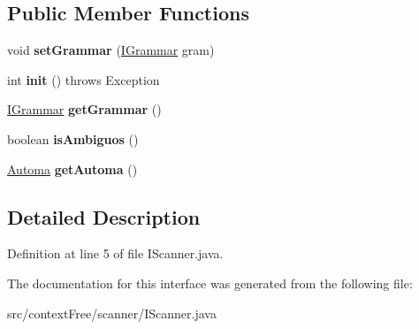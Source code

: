 \subsection*{Public Member Functions}
\begin{DoxyCompactItemize}
\item 
\hypertarget{interfacecontext_free_1_1scanner_1_1_i_scanner_a232592dfb2897cf3a2e670b5fcab88ef}{void {\bfseries set\-Grammar} (\hyperlink{interfacecontext_free_1_1grammar_1_1_i_grammar}{I\-Grammar} gram)}\label{interfacecontext_free_1_1scanner_1_1_i_scanner_a232592dfb2897cf3a2e670b5fcab88ef}

\item 
\hypertarget{interfacecontext_free_1_1scanner_1_1_i_scanner_a8d6c2d52535e9806b48d7f26cb3744dc}{int {\bfseries init} ()  throws Exception}\label{interfacecontext_free_1_1scanner_1_1_i_scanner_a8d6c2d52535e9806b48d7f26cb3744dc}

\item 
\hypertarget{interfacecontext_free_1_1scanner_1_1_i_scanner_acb2a52fff0d9e1cedd1c4078cd65baf9}{\hyperlink{interfacecontext_free_1_1grammar_1_1_i_grammar}{I\-Grammar} {\bfseries get\-Grammar} ()}\label{interfacecontext_free_1_1scanner_1_1_i_scanner_acb2a52fff0d9e1cedd1c4078cd65baf9}

\item 
\hypertarget{interfacecontext_free_1_1scanner_1_1_i_scanner_a4ad530ab63f057fe97333c900fd82a7e}{boolean {\bfseries is\-Ambiguos} ()}\label{interfacecontext_free_1_1scanner_1_1_i_scanner_a4ad530ab63f057fe97333c900fd82a7e}

\item 
\hypertarget{interfacecontext_free_1_1scanner_1_1_i_scanner_a0d7d7f324a2fd39a2fe4bfb1b73dde90}{\hyperlink{classcontext_free_1_1scanner_1_1_automa}{Automa} {\bfseries get\-Automa} ()}\label{interfacecontext_free_1_1scanner_1_1_i_scanner_a0d7d7f324a2fd39a2fe4bfb1b73dde90}

\end{DoxyCompactItemize}


\subsection{Detailed Description}


Definition at line 5 of file I\-Scanner.\-java.



The documentation for this interface was generated from the following file\-:\begin{DoxyCompactItemize}
\item 
src/context\-Free/scanner/I\-Scanner.\-java\end{DoxyCompactItemize}
